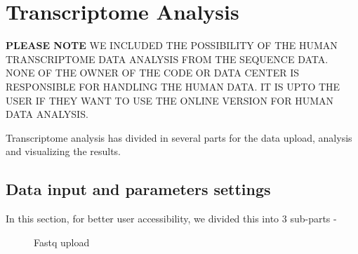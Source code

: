 \documentclass[
  a4paper,
  DIV=11,
  numbers=noendperiod,
  oneside,
  open=any]{scrreport}
\begin{document}
\chapter{Transcriptome Analysis}\label{sec-transcript}

\begin{tcolorbox}[enhanced jigsaw, coltitle=black, colback=white, title=\textcolor{quarto-callout-important-color}{\faExclamation}\hspace{0.5em}{IMPORTANT}, leftrule=.75mm, titlerule=0mm, colframe=quarto-callout-important-color-frame, toprule=.15mm, opacityback=0, arc=.35mm, breakable, rightrule=.15mm, colbacktitle=quarto-callout-important-color!10!white, bottomtitle=1mm, opacitybacktitle=0.6, left=2mm, bottomrule=.15mm, toptitle=1mm]

\textbf{PLEASE NOTE} WE INCLUDED THE POSSIBILITY OF THE HUMAN
TRANSCRIPTOME DATA ANALYSIS FROM THE SEQUENCE DATA. NONE OF THE OWNER OF
THE CODE OR DATA CENTER IS RESPONSIBLE FOR HANDLING THE HUMAN DATA. IT
IS UPTO THE USER IF THEY WANT TO USE THE ONLINE VERSION FOR HUMAN DATA
ANALYSIS.

\end{tcolorbox}

Transcriptome analysis has divided in several parts for the data upload,
analysis and visualizing the results.

\section{Data input and parameters
settings}\label{data-input-and-parameters-settings}

In this section, for better user accessibility, we divided this into 3
sub-parts -

\begin{figure}[H]


\caption{\label{fig-trans1}Fastq upload}

\end{figure}%
\end{document}
